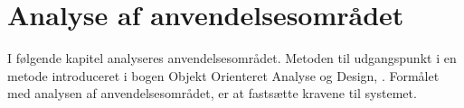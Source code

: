 \chapter{Analyse af anvendelsesområdet}
\label{chap:analyseafao}

I følgende kapitel analyseres anvendelsesområdet. Metoden til udgangspunkt i en metode introduceret i bogen Objekt Orienteret Analyse og Design, \cite[p. ~113]{ooad}. Formålet med analysen af anvendelsesområdet, er at fastsætte kravene til \Foodl systemet.




